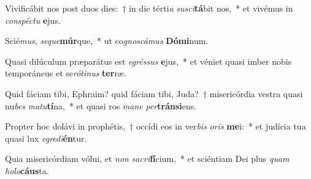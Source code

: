 \item Vivificábit nos post duos dies:~† in die térti\textit{a} \textit{su}\textit{sci}\textbf{tá}bit nos,~* et vivémus in \textit{con}\textit{spéc}\textit{tu} \textbf{e}jus.
\item Scié\textit{mus}, \textit{se}\textit{que}\textbf{múr}que,~* ut co\textit{gnos}\textit{cá}\textit{mus} \textbf{Dó}\textbf{mi}num.
\item Quasi dilúculum præparátus est \textit{e}\textit{grés}\textit{sus} \textbf{e}jus,~* et véniet quasi imber nobis temporáneus et se\textit{ró}\textit{ti}\textit{nus} \textbf{ter}ræ.
\item Quid fáciam tibi, Ephraim? quid fáciam tibi, Juda?~† misericórdia vestra quasi nu\textit{bes} \textit{ma}\textit{tu}\textbf{tí}na,~* et quasi ros \textit{ma}\textit{ne} \textit{per}\textbf{tráns}\textbf{i}ens.
\item Propter hoc dolávi in prophétis,~† occídi eos in ver\textit{bis} \textit{o}\textit{ris} \textbf{me}i:~* et judícia tua quasi lux \textit{e}\textit{gre}\textit{di}\textbf{én}tur.
\item Quia misericórdiam vólui, et \textit{non} \textit{sa}\textit{cri}\textbf{fí}cium,~* et sciéntiam Dei plus \textit{quam} \textit{ho}\textit{lo}\textbf{cáus}ta.
